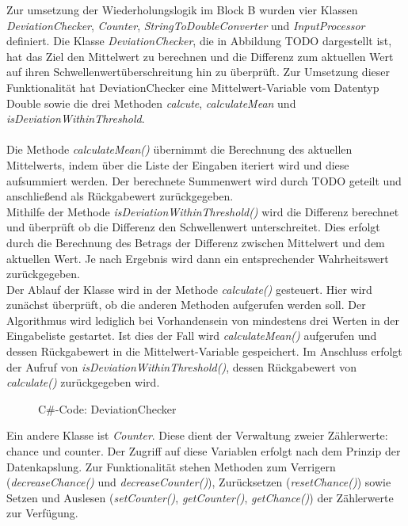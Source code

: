     Zur umsetzung der Wiederholungslogik im Block B wurden vier Klassen \textit{DeviationChecker}, \textit{Counter}, \textit{StringToDoubleConverter} und \textit{InputProcessor} definiert.
    Die Klasse \textit{DeviationChecker}, die in Abbildung TODO dargestellt ist, hat das Ziel den Mittelwert zu berechnen und die Differenz zum aktuellen Wert auf ihren Schwellenwertüberschreitung hin zu überprüft.
    Zur Umsetzung dieser Funktionalität hat DeviationChecker eine Mittelwert-Variable vom Datentyp Double sowie die drei Methoden \textit{calcute}, \textit{calculateMean} und \textit{isDeviationWithinThreshold}.\\
    \\
    Die Methode \textit{calculateMean()} übernimmt die Berechnung des aktuellen Mittelwerts, indem über die Liste der Eingaben iteriert wird und diese aufsummiert werden.
    Der berechnete Summenwert wird durch TODO geteilt und anschließend als Rückgabewert zurückgegeben.\\
    Mithilfe der Methode \textit{isDeviationWithinThreshold()} wird die Differenz berechnet und überprüft ob die Differenz den Schwellenwert unterschreitet.
    Dies erfolgt durch die Berechnung des Betrags der Differenz zwischen Mittelwert und dem aktuellen Wert.
    Je nach Ergebnis wird dann ein entsprechender Wahrheitswert zurückgegeben.\\
    Der Ablauf der Klasse wird in der Methode \textit{calculate()} gesteuert. Hier wird zunächst überprüft, ob die anderen Methoden aufgerufen werden soll.
    Der Algorithmus wird lediglich bei Vorhandensein von mindestens drei Werten in der Eingabeliste gestartet.
    Ist dies der Fall wird \textit{calculateMean()} aufgerufen und dessen Rückgabewert in die Mittelwert-Variable gespeichert.
    Im Anschluss erfolgt der Aufruf von \textit{isDeviationWithinThreshold()}, dessen Rückgabewert von \textit{calculate()} zurückgegeben wird.
    \begin{figure}[H]
        \centering
        
        \caption{C\#-Code: DeviationChecker}
    \end{figure}    
    Ein andere Klasse ist \textit{Counter}.
    Diese dient der Verwaltung zweier Zählerwerte: chance und counter.
    Der Zugriff auf diese Variablen erfolgt nach dem Prinzip der Datenkapslung.
    Zur Funktionalität stehen Methoden zum Verrigern (\textit{decreaseChance()} und \textit{decreaseCounter()}), Zurücksetzen (\textit{resetChance()}) sowie Setzen und Auslesen (\textit{setCounter()}, \textit{getCounter()}, \textit{getChance()}) der Zählerwerte zur Verfügung.
